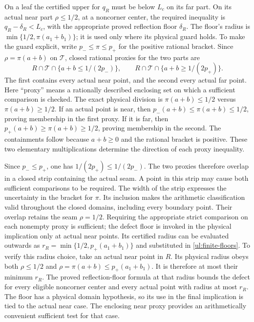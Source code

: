 On a leaf the certified upper for $q_R$ must be below $L_c$ on its far
part. On its actual near part $\rho\leq1/2$, at a noncorner center,
the required inequality is $q_R-\delta_R<L_c$, with the appropriate
proved reflection floor $\delta_R$. The floor's radius is
$\min\{1/2,\pi(a_1+b_1)\}$; it is used only where its physical guard
holds. To make the guard explicit, write $p_-\leq\pi\leq p_+$ for the
positive rational bracket. Since $\rho=\pi(a+b)$ on $\mathcal T$,
closed rational proxies for the two parts are
\[
 R\cap\mathcal T\cap\{a+b\leq1/(2p_-)\},\qquad
 R\cap\mathcal T\cap\{a+b\geq1/(2p_+)\}.
\]
The first contains every actual near point, and the second every actual
far point.
Here ``proxy'' means a rationally described enclosing set on which a
sufficient comparison is checked. The exact physical division is
$\pi(a+b)\leq1/2$ versus $\pi(a+b)\geq1/2$. If an actual point
is near, then $p_-(a+b)\leq\pi(a+b)\leq1/2$, proving membership
in the first proxy. If it is far, then
$p_+(a+b)\geq\pi(a+b)\geq1/2$, proving membership in the second.
The containments follow because $a+b\geq0$ and the rational bracket
is positive. These two elementary multiplications determine the
direction of each proxy inequality.

Since $p_-\leq p_+$, one has
$1/(2p_+)\leq1/(2p_-)$. The two proxies therefore overlap in a
closed strip containing the actual seam. A point in this strip may
cause both sufficient comparisons to be required. The width of the
strip expresses the uncertainty in the bracket for $\pi$. Its
inclusion makes the arithmetic classification valid throughout the
closed domains, including every boundary point.
Their overlap retains the seam $\rho=1/2$. Requiring the
appropriate strict comparison on each nonempty proxy is sufficient;
the defect floor is invoked in the physical implication only at actual
near points. Its certified radius can be evaluated outwards as
$r_R=\min\{1/2,p_+(a_1+b_1)\}$ and substituted in
\eqref{ul:finite-floors}.
To verify this radius choice, take an actual near point in $R$.
Its physical radius obeys both $\rho\leq1/2$ and
$\rho=\pi(a+b)\leq p_+(a_1+b_1)$. It is therefore at most their
minimum $r_R$. The proved reflection-floor formula at that radius
bounds the defect for every eligible noncorner center and every
actual point with radius at most $r_R$. The floor has a physical
domain hypothesis, so its use in the final implication is tied to
the actual near case. The enclosing near proxy provides an
arithmetically convenient sufficient test for that case.

